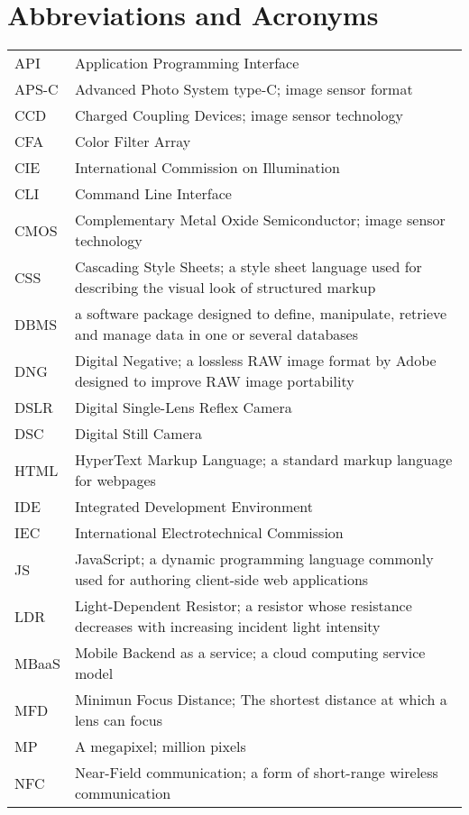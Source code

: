\documentclass[thesis.tex]{subfiles}
\begin{document}
\chapter*{Abbreviations and Acronyms}

\noindent
\begin{longtable}{@{}p{}p{}@{}}
API & Application Programming Interface \\
APS-C & Advanced Photo System type-C; image sensor format \\
CCD & Charged Coupling Devices; image sensor technology \\
CFA & Color Filter Array \\
CIE & International Commission on Illumination \\
CLI & Command Line Interface \\
CMOS & Complementary Metal Oxide Semiconductor; image sensor technology \\
CSS & Cascading Style Sheets; a style sheet language used for describing the visual look of structured markup \\
DBMS & a software package designed to define, manipulate, retrieve and manage data in one or several databases \\
DNG & Digital Negative; a lossless RAW image format by Adobe designed to improve RAW image portability \\
DSLR & Digital Single-Lens Reflex Camera \\
DSC & Digital Still Camera \\
HTML & HyperText Markup Language; a standard markup language for webpages \\
IDE & Integrated Development Environment \\
IEC & International Electrotechnical Commission \\
JS & JavaScript; a dynamic programming language commonly used for authoring client-side web applications \\
LDR & Light-Dependent Resistor; a resistor whose resistance decreases with increasing incident light intensity \\
MBaaS & Mobile Backend as a service; a cloud computing service model \\
MFD & Minimun Focus Distance; The shortest distance at which a lens can focus \\
MP & A megapixel; million pixels \\
NFC & Near-Field communication; a form of short-range wireless communication \\

\end{longtable}
\end{document}
